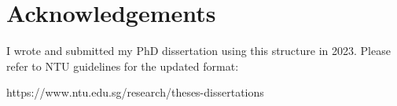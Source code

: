 \chapter*{Acknowledgements}
 {
  I wrote and submitted my PhD dissertation using this structure in 2023. Please refer to NTU guidelines for the updated format:

  https://www.ntu.edu.sg/research/theses-dissertations
 }
